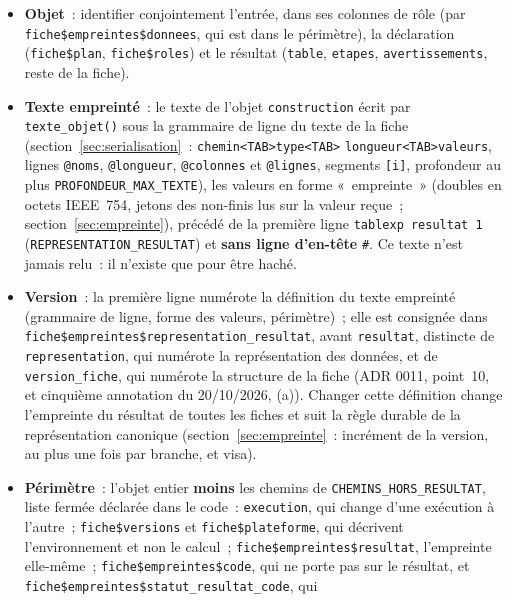 \documentclass[a4paper,11pt]{article}
\newcommand{\code}[1]{\texttt{\small #1}}
\begin{document}
\begin{itemize}[leftmargin=*, itemsep=2pt]
  \item \textbf{Objet}~: identifier conjointement l'entrée, dans ses colonnes de rôle (par
    \code{fiche\$empreintes\$donnees}, qui est dans le périmètre), la
    déclaration (\code{fiche\$plan}, \code{fiche\$roles}) et le résultat
    (\code{table}, \code{etapes}, \code{avertissements}, reste de la
    fiche).
  \item \textbf{Texte empreinté}~: le texte de l'objet \code{construction}
    écrit par \code{texte\_objet()} sous la grammaire de ligne du texte de la
    fiche (section~\ref{sec:serialisation}~: \code{chemin<TAB>type<TAB>}%
    \allowbreak\code{longueur<TAB>valeurs}, lignes \code{@noms},
    \code{@longueur}, \code{@colonnes} et \code{@lignes}, segments
    \code{[i]}, profondeur au plus \code{PROFONDEUR\_MAX\_TEXTE}), les valeurs
    en forme «~empreinte~» (doubles en octets IEEE~754, jetons des non-finis
    lus sur la valeur reçue~; section~\ref{sec:empreinte}), précédé de la
    première ligne \code{tablexp resultat 1} (\code{REPRESENTATION\_RESULTAT})
    et \textbf{sans ligne d'en-tête} \code{\#}. Ce texte n'est jamais relu~:
    il n'existe que pour être haché.
  \item \textbf{Version}~: la première ligne numérote la définition du texte
    empreinté (grammaire de ligne, forme des valeurs, périmètre)~; elle est
    consignée dans \code{fiche\$empreintes\$representation\_resultat}, avant
    \code{resultat}, distincte de \code{representation}, qui numérote la
    représentation des données, et de \code{version\_fiche}, qui numérote la
    structure de la fiche (ADR 0011, point~10, et cinquième annotation du
    20/10/2026, (a)). Changer cette définition change l'empreinte du
    résultat de toutes les fiches et suit la règle durable de la
    représentation canonique (section~\ref{sec:empreinte}~: incrément de la
    version, au plus une fois par branche, et visa).
  \item \sloppy \textbf{Périmètre}~: l'objet entier \textbf{moins} les chemins de
    \code{CHEMINS\_HORS\_RESULTAT}, liste fermée déclarée dans le code~:
    \code{execution}, qui change d'une exécution à l'autre~;
    \code{fiche\$versions} et \code{fiche\$plateforme}, qui décrivent
    l'environnement et non le calcul~; \code{fiche\$empreintes\$resultat},
    l'empreinte elle-même~; \code{fiche\$empreintes\$}\allowbreak\code{code}, qui ne porte pas
    sur le résultat, et \code{fiche\$empreintes\$}\allowbreak\code{statut\_resultat\_code}, qui

\end{itemize}
\end{document}
